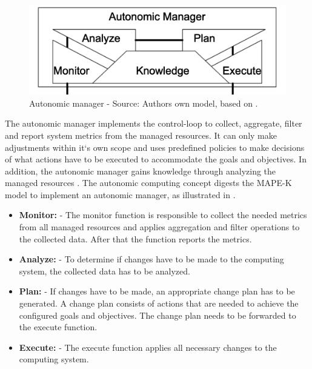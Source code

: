 \begin{figure}[h]%
\centering
\includegraphics[scale=1]{images/03_background/ac_autonomic_manager}%
\caption{Autonomic manager - Source: Authors own model, based on \cite{Jacob2004AutonomicSolution}.}%
\label{fig:ac_manager}%
\end{figure}

The autonomic manager implements the control-loop to collect, aggregate, filter and report system metrics from the managed resources. It can only make adjustments within it`s own scope and uses predefined policies to make decisions of what actions have to be executed to accommodate the goals and objectives\cite{Murch2004Autonomic, Kephart2003VisionComputing}.
In addition, the autonomic manager gains knowledge through analyzing the managed resources \cite{Murch2004Autonomic}.
The autonomic computing concept digests the MAPE-K model to implement an autonomic manager, as illustrated in  \cite{Goscinski2011CloudComputing}.

\begin{itemize}
\item \textbf{Monitor:}
- The monitor function is responsible to collect the needed metrics from all managed resources and applies aggregation and filter
operations to the collected data. After that the function reports the metrics.

\item \textbf{Analyze:}
- To determine if changes have to be made to the computing system, the collected data has to be analyzed.

\item \textbf{Plan:}
- If changes have to be made, an appropriate change plan has to be generated. A change plan consists of actions that are needed to achieve the configured goals and objectives. The change plan needs to be forwarded to the execute function.

\item \textbf{Execute:}
- The execute function applies all necessary changes to the computing system.

\end{itemize}




